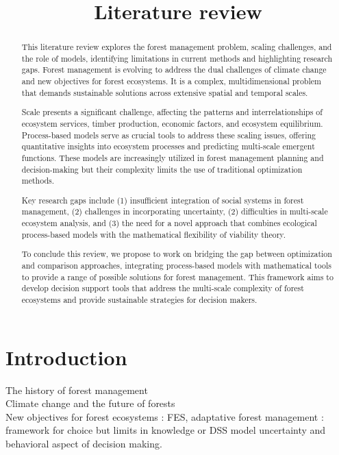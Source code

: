 \documentclass{article}
\title{Literature review}
\begin{document}
\maketitle

\tableofcontents

\newpage

\begin{abstract}
    This literature review explores the forest management problem, scaling challenges, and the role of models, identifying limitations in current methods and highlighting research gaps. Forest management is evolving to address the dual challenges of climate change and new objectives for forest ecosystems. It is a complex, multidimensional problem that demands sustainable solutions across extensive spatial and temporal scales.
    
    Scale presents a significant challenge, affecting the patterns and interrelationships of ecosystem services, timber production, economic factors, and ecosystem equilibrium. Process-based models serve as crucial tools to address these scaling issues, offering quantitative insights into ecosystem processes and predicting multi-scale emergent functions. These models are increasingly utilized in forest management planning and decision-making but their complexity limits the use of traditional optimization methods.
    
    Key research gaps include (1) insufficient integration of social systems in forest management, (2) challenges in incorporating uncertainty, (2) difficulties in multi-scale ecosystem analysis, and (3) the need for a novel approach that combines ecological process-based models with the mathematical flexibility of viability theory.
    
    To conclude this review, we propose to work on bridging the gap between optimization and comparison approaches, integrating process-based models with mathematical tools to provide a range of possible solutions for forest management. This framework aims to develop decision support tools that address the multi-scale complexity of forest ecosystems and provide sustainable strategies for decision makers.
\end{abstract}

\newpage

\section{Introduction}

The history of forest management \\
Climate change and the future of forests \\
New objectives for forest ecosystems : FES, adaptative forest management \cite{yousefpourFrameworkModelingAdaptive2017} : framework for choice but limits in knowledge or DSS model uncertainty and behavioral aspect of decision making. \\ %
\end{document}
